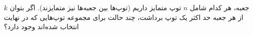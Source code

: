 $k$
جعبه، هر کدام شامل
$n$
توپ متمایز داریم
(توپ‌ها بین جعبه‌ها نیز متمایزند).
اگر بتوان از هر جعبه حد اکثر یک توپ برداشت، چند حالت برای مجموعه توپ‌هایی
که در نهایت انتخاب شده‌اند وجود دارد؟